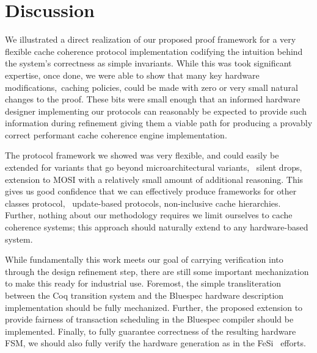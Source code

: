 \section{Discussion}

We illustrated a direct realization of our proposed proof framework
for a very flexible cache coherence protocol implementation codifying
the intuition behind the system's correctness as simple
invariants. While this was took significant expertise, once done, we
were able to show that many key hardware modifications,\eg\ caching
policies, could be made with zero or very small natural changes to the
proof. These bits were small enough that an informed hardware designer
implementing our protocols can reasonably be expected to provide such
information during refinement giving them a viable path for producing
a provably correct performant cache coherence engine implementation.

The protocol framework we showed was very flexible, and could easily
be extended for variants that go beyond microarchitectural variants,
\eg\ silent drops, extension to MOSI with a relatively small amount of
additional reasoning.  This gives us good confidence that we can
effectively produce frameworks for other classes protocol,
\eg\ update-based protocols, non-inclusive cache hierarchies. Further,
nothing about our methodology requires we limit ourselves to cache
coherence systems; this approach should naturally extend to any
hardware-based system.

While fundamentally this work meets our goal of carrying verification
into through the design refinement step, there are still some
important mechanization to make this ready for industrial
use. Foremost, the simple transliteration between the Coq transition
system and the Bluespec hardware description implementation should be
fully mechanized. Further, the proposed extension to provide fairness
of transaction scheduling in the Bluespec compiler should be
implemented. Finally, to fully guarantee correctness of the resulting
hardware FSM, we should also fully verify the hardware generation as
in the FeSi~\cite{Tomas} efforts. 

